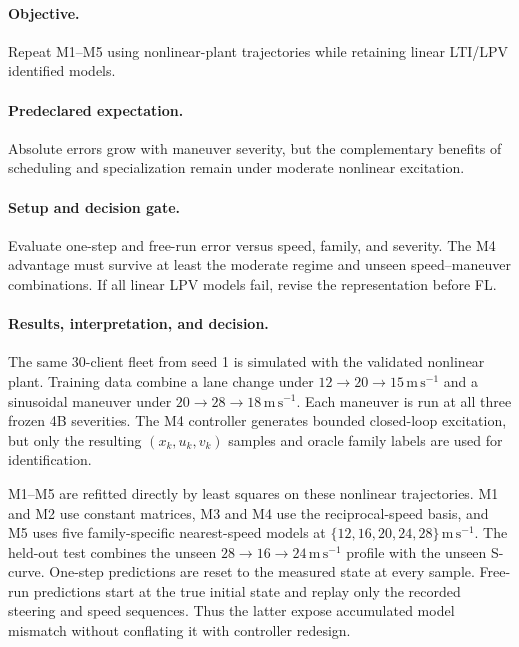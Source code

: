 \paragraph{Objective.}
Repeat M1--M5 using nonlinear-plant trajectories while retaining linear LTI/LPV
identified models.

\paragraph{Predeclared expectation.}
Absolute errors grow with maneuver severity, but the complementary benefits of
scheduling and specialization remain under moderate nonlinear excitation.

\paragraph{Setup and decision gate.}
Evaluate one-step and free-run error versus speed, family, and severity. The M4
advantage must survive at least the moderate regime and unseen speed--maneuver
combinations. If all linear LPV models fail, revise the representation before FL.

\paragraph{Results, interpretation, and decision.}
The same 30-client fleet from seed 1 is simulated with the validated nonlinear
plant. Training data combine a lane change under
$12\rightarrow20\rightarrow15\,\mathrm{m\,s^{-1}}$ and a sinusoidal maneuver
under $20\rightarrow28\rightarrow18\,\mathrm{m\,s^{-1}}$. Each maneuver is
run at all three frozen 4B severities. The M4 controller generates bounded
closed-loop excitation, but only the resulting $(x_k,u_k,v_k)$ samples and oracle
family labels are used for identification.

M1--M5 are refitted directly by least squares on these nonlinear trajectories.
M1 and M2 use constant matrices, M3 and M4 use the reciprocal-speed basis, and
M5 uses five family-specific nearest-speed models at
$\{12,16,20,24,28\}\,\mathrm{m\,s^{-1}}$. The held-out test combines the unseen
$28\rightarrow16\rightarrow24\,\mathrm{m\,s^{-1}}$ profile with the unseen
S-curve. One-step predictions are reset to the measured state at every sample.
Free-run predictions start at the true initial state and replay only the recorded
steering and speed sequences. Thus the latter expose accumulated model mismatch
without conflating it with controller redesign.

